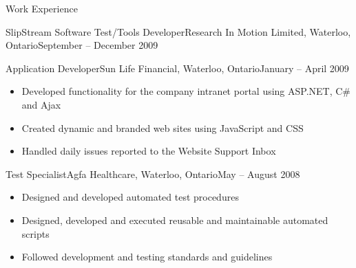 \documentclass[11pt]{article}
\begin{document}
\begin{section}{Work Experience}
\begin{subsection}{SlipStream Software Test/Tools Developer}{Research In Motion Limited, Waterloo, Ontario}{September -- December 2009}
		\end{subsection}

		\begin{subsection}{Application Developer}{Sun Life Financial, Waterloo, Ontario}{January -- April 2009}

			\begin{itemize}
				\item Developed functionality for the company intranet portal using ASP.NET, C\# and Ajax
				\item Created dynamic and branded web sites using JavaScript and CSS
				\item Handled daily issues reported to the Website Support Inbox
			\end{itemize}

		\end{subsection}

		\begin{subsection}{Test Specialist}{Agfa Healthcare, Waterloo, Ontario}{May -- August 2008}

			\begin{itemize}
				\item Designed and developed automated test procedures
				\item Designed, developed and executed reusable and maintainable automated scripts
				\item Followed development and testing standards and guidelines
			\end{itemize}

		\end{subsection}

	\end{section}
\end{document}
